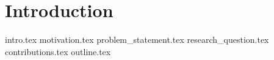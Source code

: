 \chapter{Introduction}
\label{ch:1}
{intro.tex}
{motivation.tex}
{problem_statement.tex}
{research_question.tex}
{contributions.tex}
{outline.tex}
